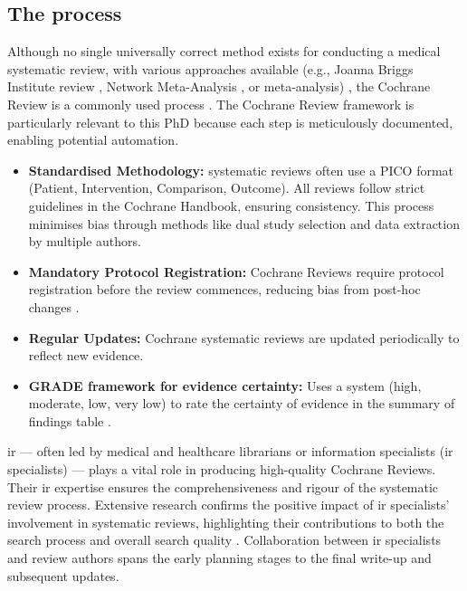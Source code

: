 \documentclass{article}
\begin{document}
\subsection{The process}

Although no single universally correct method exists for conducting a medical systematic review, with various approaches available (e.g., Joanna Briggs Institute review \cite{santos_joanna_2018}, Network Meta-Analysis \cite{bafeta_reporting_2014}, or meta-analysis\cite{moher_improving_1999}) \cite{munn_what_2018}, the Cochrane Review is a commonly used process \cite{cipriani_what_2011}. The Cochrane Review framework is particularly relevant to this PhD because each step is meticulously documented, enabling potential automation.


\begin{itemize}
    \item {\bf{Standardised Methodology:}} systematic reviews often use a PICO format (Patient, Intervention, Comparison, Outcome). All reviews follow strict guidelines in the Cochrane Handbook, ensuring consistency. This process minimises bias through methods like dual study selection and data extraction by multiple authors.
    \item {\bf{Mandatory Protocol Registration:}} Cochrane Reviews require protocol registration before the review commences, reducing bias from post-hoc changes \cite{cumpston_chapter_2024}.
    \item {\bf{Regular Updates:}} Cochrane systematic reviews are updated periodically to reflect new evidence.
    \item {\bf{GRADE framework for evidence certainty:}} Uses a system (high, moderate, low, very low) to rate the certainty of evidence in the summary of findings table \cite{guyatt_grade_2008}.
\end{itemize}



\gls*{ir} — often led by medical and healthcare librarians or information specialists (\gls*{ir} specialists) — plays a vital role in producing high-quality Cochrane Reviews. Their \gls*{ir} expertise ensures the comprehensiveness and rigour of the systematic review process. Extensive research confirms the positive impact of \gls*{ir} specialists' involvement in systematic reviews, highlighting their contributions to both the search process \cite{le_benchmarking_2023, brunskill_case_2022, schvaneveldt_assessing_2021} and overall search quality \cite{giroudon_qualite_2023, pawliuk_librarian_2024, ramirez_adherence_2022}. Collaboration between \gls*{ir} specialists and review authors spans the early planning stages to the final write-up and subsequent updates.
\end{document}
